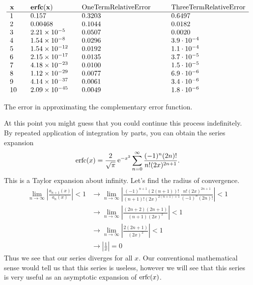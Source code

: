 \begin{Example}
  \begin{table}
    \[
    \begin{array}{llll}
      \mathbf{x}      &\mathbf{\mathop{\mathbf{erfc}}\nolimits(x)}     
      & \mathrm{One Term Relative Error} \qquad
      & \mathrm{Three Term Relative Error} \\
      \hline
      1       &0.157                  &0.3203         &0.6497 \\
      2       &0.00468                &0.1044         &0.0182 \\
      3       &2.21\times 10^{-5}  &0.0507         &0.0020 \\
      4       &1.54\times 10^{-8}  &0.0296         &3.9 \cdot 10^{-4} \\
      5       &1.54\times 10^{-12} &0.0192         &1.1 \cdot 10^{-4}\\
      6       &2.15\times 10^{-17} &0.0135         &3.7 \cdot 10^{-5}\\
      7       &4.18\times 10^{-23} &0.0100         &1.5 \cdot 10^{-5}\\
      8       &1.12\times 10^{-29} &0.0077         &6.9 \cdot 10^{-6}\\
      9       &4.14\times 10^{-37} &0.0061         &3.4 \cdot 10^{-6}\\
      10 \quad &2.09\times 10^{-45}\quad &0.0049 
      &1.8 \cdot 10^{-6}
    \end{array}
    \]
    \caption{The error in approximating the complementary error function.}
    \label{table_ltt}
  \end{table}


  At this point you might guess that you could continue this process 
  indefinitely.  By repeated application of integration by parts, you can
  obtain the series expansion
  \[ \mathop{\mathrm{erfc}}\nolimits(x) = \frac{2}{\sqrt{\pi}} \mathop{\mathrm{e}}\nolimits^{-x^2} \sum_{n=0}^\infty 
  \frac{(-1)^n (2n)!}{n! (2x)^{2n+1}}.\]
  This is a Taylor expansion about infinity.  Let's find the radius of 
  convergence.
  \begin{align*}
    \lim_{n \to \infty} \left| \frac{a_{n+1}(x)}{a_n(x)}\right| < 1 
    &\to \lim_{n \to \infty} \left| \frac{(-1)^{n+1} (2(n+1))!}
      {(n+1)! (2x)^{2(n+1)+1}} \frac{n! (2x)^{2n+1}}{(-1)^n (2n)!}
    \right| < 1 \\
    &\to \lim_{n \to \infty} \left|\frac{(2n+2)(2n+1)}{(n+1)(2x)^2}\right|
    < 1 \\
    &\to \lim_{n \to \infty} \left|\frac{2(2n+1)}{(2x)^2}\right| < 1 \\
    &\to \left| \frac{1}{x}\right| = 0
  \end{align*}
  Thus we see that our series diverges for all $x$.  Our conventional 
  mathematical sense would tell us that this series is useless, however we
  will see that this series is very useful as an asymptotic expansion of
  $\mathop{\mathrm{erfc}}\nolimits(x)$.  


\end{Example}
